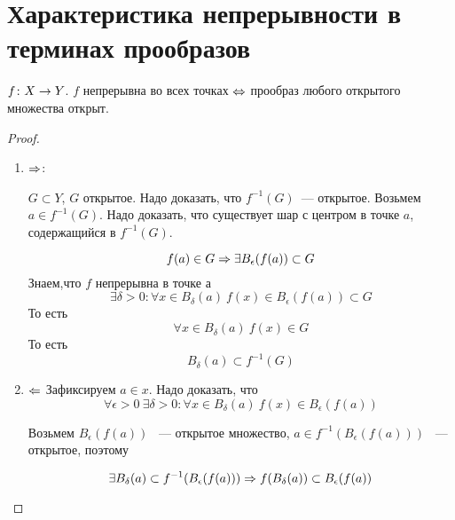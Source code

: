 ﻿\section{Характеристика непрерывности в терминах прообразов}

\begin{theorem}{}
$f\colon X \rightarrow Y$. $f$ непрерывна во всех точках $\Leftrightarrow$ прообраз любого открытого множества открыт.
\end{theorem}

\begin{proof}
\begin{enumerate}
\item $\Rightarrow$:

$G \subset Y$, $G$ открытое. Надо доказать, что  $f^{-1}(G)$~--- открытое. Возьмем $a \in f^{-1}(G)$. Надо доказать, что существует шар с центром в точке $a$, содержащийся в $f^{-1}(G)$.

$$f(a) \in G \Rightarrow \exists B_{\epsilon}(f(a)) \subset G$$
Знаем,что $f$ непрерывна в точке $а$
$$\exists \delta > 0\colon \forall x \in B_{\delta}(a)\: f(x) \in B_{\epsilon}(f(a)) \subset G$$
То есть
$$\forall x \in B_{\delta}(a)\: f(x) \in G $$
То есть 
$$B_{\delta}(a) \subset f^{-1}(G) $$

\item $\Leftarrow$
Зафиксируем $a \in x$. Надо доказать, что 
$$\forall \epsilon > 0\: \exists \delta > 0\colon \forall x \in B_{\delta}(a)\: f(x) \in B_{\epsilon}(f(a))$$

Возьмем $B_{\epsilon}(f(a))$ ~--- открытое множество, $a \in f^{-1}(B_{\epsilon}(f(a)))$ ~--- открытое, поэтому 

$$\exists B_{\delta}(a) \subset f^{-1}(B_{\epsilon}(f(a))) \Rightarrow f(B_{\delta}(a)) \subset B_{\epsilon}(f(a))$$
\end{enumerate}
\end{proof}